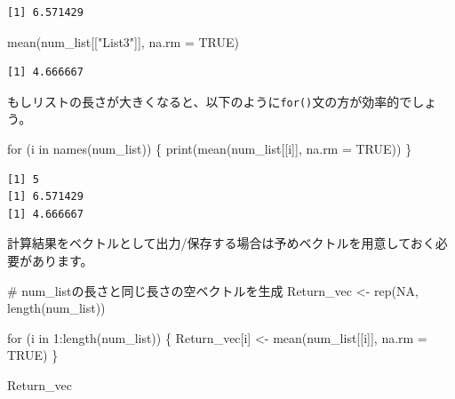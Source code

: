 \documentclass[
  a4paper,
  pandoc,
  ja=standard,
  jafont=haranoaji]{bxjsbook}
\newenvironment{Shaded}{\begin{snugshade}}{\end{snugshade}}
\newcommand{\AttributeTok}[1]{\textcolor[rgb]{0.00,0.48,0.65}{#1}}
\newcommand{\CommentTok}[1]{\textcolor[rgb]{0.37,0.37,0.37}{#1}}
\newcommand{\ConstantTok}[1]{\textcolor[rgb]{0.56,0.35,0.01}{#1}}
\newcommand{\ControlFlowTok}[1]{\textcolor[rgb]{0.00,0.48,0.65}{#1}}
\newcommand{\DecValTok}[1]{\textcolor[rgb]{0.68,0.00,0.00}{#1}}
\newcommand{\FunctionTok}[1]{\textcolor[rgb]{0.28,0.35,0.67}{#1}}
\newcommand{\NormalTok}[1]{\textcolor[rgb]{0.00,0.48,0.65}{#1}}
\newcommand{\OtherTok}[1]{\textcolor[rgb]{0.00,0.48,0.65}{#1}}
\newcommand{\SpecialCharTok}[1]{\textcolor[rgb]{0.37,0.37,0.37}{#1}}
\newcommand{\StringTok}[1]{\textcolor[rgb]{0.13,0.47,0.30}{#1}}
\begin{document}
\begin{verbatim}
[1] 6.571429
\end{verbatim}

\begin{Shaded}
\begin{Highlighting}[numbers=left,,]
\FunctionTok{mean}\NormalTok{(num\_list[[}\StringTok{"List3"}\NormalTok{]], }\AttributeTok{na.rm =} \ConstantTok{TRUE}\NormalTok{)}
\end{Highlighting}
\end{Shaded}

\begin{verbatim}
[1] 4.666667
\end{verbatim}

もしリストの長さが大きくなると、以下のように\texttt{for()}文の方が効率的でしょう。

\begin{Shaded}
\begin{Highlighting}[numbers=left,,]
\ControlFlowTok{for}\NormalTok{ (i }\ControlFlowTok{in} \FunctionTok{names}\NormalTok{(num\_list)) \{}
    \FunctionTok{print}\NormalTok{(}\FunctionTok{mean}\NormalTok{(num\_list[[i]], }\AttributeTok{na.rm =} \ConstantTok{TRUE}\NormalTok{))}
\NormalTok{\}}
\end{Highlighting}
\end{Shaded}

\begin{verbatim}
[1] 5
[1] 6.571429
[1] 4.666667
\end{verbatim}

計算結果をベクトルとして出力/保存する場合は予めベクトルを用意しておく必要があります。

\begin{Shaded}
\begin{Highlighting}[numbers=left,,]
\CommentTok{\# num\_listの長さと同じ長さの空ベクトルを生成}
\NormalTok{Return\_vec }\OtherTok{\textless{}{-}} \FunctionTok{rep}\NormalTok{(}\ConstantTok{NA}\NormalTok{, }\FunctionTok{length}\NormalTok{(num\_list))}

\ControlFlowTok{for}\NormalTok{ (i }\ControlFlowTok{in} \DecValTok{1}\SpecialCharTok{:}\FunctionTok{length}\NormalTok{(num\_list)) \{}
\NormalTok{    Return\_vec[i] }\OtherTok{\textless{}{-}} \FunctionTok{mean}\NormalTok{(num\_list[[i]], }\AttributeTok{na.rm =} \ConstantTok{TRUE}\NormalTok{)}
\NormalTok{\}}

\NormalTok{Return\_vec}
\end{Highlighting}
\end{Shaded}
\end{document}
